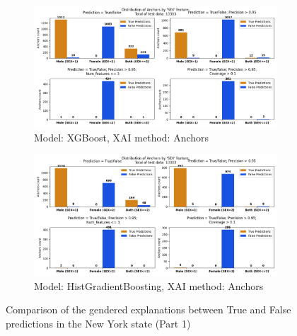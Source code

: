 \begin{figure}[h]
    \centering
    \begin{subfigure}[b]{0.9\textwidth}
        \includegraphics[width=\textwidth]{Images/distribution_folktables/pca_xg_ny_anchors.png}
        \caption{Model: XGBoost, XAI method: Anchors}
        \label{fig:distr_xg_ny_anchors}
    \end{subfigure}
    \hfill
    \begin{subfigure}[b]{0.9\textwidth}
        \includegraphics[width=\textwidth]{Images/distribution_folktables/pca_skrub_ny_anchors.png}
        \caption{Model: HistGradientBoosting, XAI method: Anchors}
        \label{fig:distr_skrub_ny_anchors}
    \end{subfigure}
    \caption{Comparison of the gendered explanations between True and False predictions in the New York state (Part 1)}
 \end{figure}

